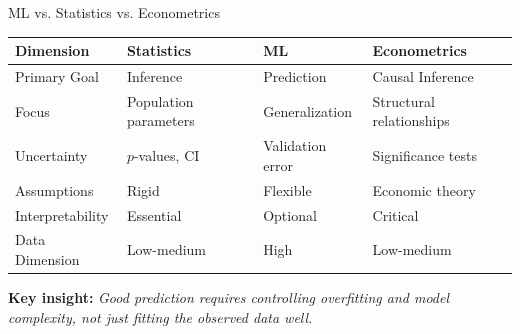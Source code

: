 \documentclass[11pt]{beamer}
\begin{document}
\begin{frame}[fragile]{ML vs. Statistics vs. Econometrics}
	\begin{table}
		\small
		\setlength{\tabcolsep}{4pt}
		\renewcommand{\arraystretch}{1.15}
		\begin{tabular}{|p{}|p{}|p{}|p{}|}
			\hline
			\textbf{Dimension} & \textbf{Statistics}   & \textbf{ML}      & \textbf{Econometrics}    \\
			\hline
			Primary Goal       & Inference             & Prediction       & Causal Inference         \\
			\hline
			Focus              & Population parameters & Generalization   & Structural relationships \\
			\hline
			Uncertainty        & $p$-values, CI        & Validation error & Significance tests       \\
			\hline
			Assumptions        & Rigid                 & Flexible         & Economic theory          \\
			\hline
			Interpretability   & Essential             & Optional         & Critical                 \\
			\hline
			Data Dimension     & Low-medium            & High             & Low-medium               \\
			\hline
		\end{tabular}
	\end{table}

	\vspace{0.3cm}
	\textbf{Key insight:} \textit{Good prediction requires controlling overfitting and model complexity, not just fitting the observed data well.}
\end{frame}
\end{document}
